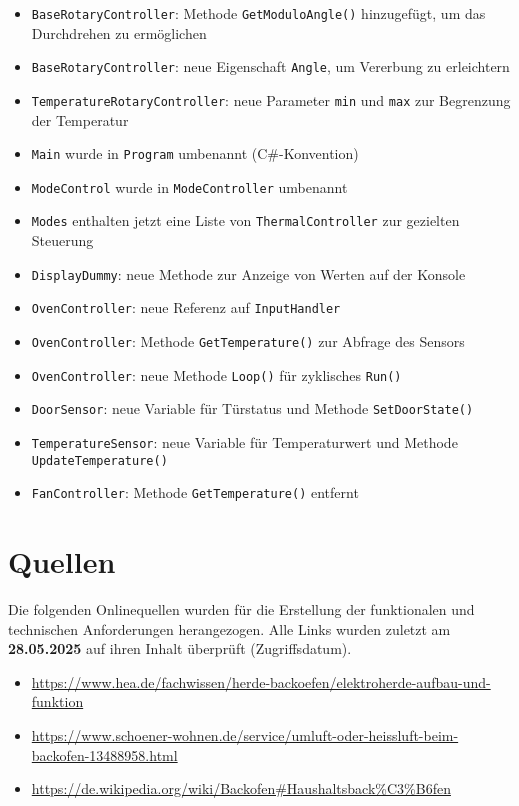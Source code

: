 \documentclass[a4paper,12pt]{article}
\begin{document}
\begin{itemize}
    \item \texttt{BaseRotaryController}: Methode \texttt{GetModuloAngle()} hinzugefügt, um das Durchdrehen zu ermöglichen
    \item \texttt{BaseRotaryController}: neue Eigenschaft \texttt{Angle}, um Vererbung zu erleichtern
    \item \texttt{TemperatureRotaryController}: neue Parameter \texttt{min} und \texttt{max} zur Begrenzung der Temperatur
    \item \texttt{Main} wurde in \texttt{Program} umbenannt (C\#-Konvention)
    \item \texttt{ModeControl} wurde in \texttt{ModeController} umbenannt
    \item \texttt{Modes} enthalten jetzt eine Liste von \texttt{ThermalController} zur gezielten Steuerung
    \item \texttt{DisplayDummy}: neue Methode zur Anzeige von Werten auf der Konsole
    \item \texttt{OvenController}: neue Referenz auf \texttt{InputHandler}
    \item \texttt{OvenController}: Methode \texttt{GetTemperature()} zur Abfrage des Sensors
    \item \texttt{OvenController}: neue Methode \texttt{Loop()} für zyklisches \texttt{Run()}
    \item \texttt{DoorSensor}: neue Variable für Türstatus und Methode \texttt{SetDoorState()}
    \item \texttt{TemperatureSensor}: neue Variable für Temperaturwert und Methode \texttt{UpdateTemperature()}
    \item \texttt{FanController}: Methode \texttt{GetTemperature()} entfernt
\end{itemize}

\section*{Quellen}

Die folgenden Onlinequellen wurden für die Erstellung der funktionalen und technischen Anforderungen herangezogen. Alle Links wurden zuletzt am \textbf{28.05.2025} auf ihren Inhalt überprüft (Zugriffsdatum).

\begin{itemize}
    \item \url{https://www.hea.de/fachwissen/herde-backoefen/elektroherde-aufbau-und-funktion}
    \item \url{https://www.schoener-wohnen.de/service/umluft-oder-heissluft-beim-backofen-13488958.html}
    \item \url{https://de.wikipedia.org/wiki/Backofen#Haushaltsback%C3%B6fen}
\end{itemize}
\end{document}
